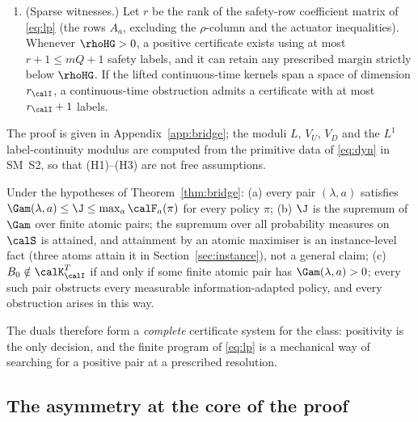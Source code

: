 \begin{theorem}
\begin{enumerate}[label=\textup{(\roman*)},leftmargin=2.4em,itemsep=2pt]
\begin{equation}
\J=\sup\bigl\{\Gam(\lambda,a):\ q\in\N,\ a_1,\dots,a_q\in\calS,\ \lambda\in\Delta_q\bigr\}.
\end{equation}
In particular, nonviability is equivalent to the existence of a positive finite atomic certificate.
\item \textup{(Sparse witnesses.)} Let $r$ be the rank of the safety-row coefficient matrix of \eqref{eq:lp} (the rows $A_a$, excluding the $\rho$-column and the actuator inequalities). Whenever $\rhoHG>0$, a positive certificate exists using at most $r+1\le mQ+1$ safety labels, and it can retain any prescribed margin strictly below $\rhoHG$. If the lifted continuous-time kernels span a space of dimension $r_\calI$, a continuous-time obstruction admits a certificate with at most $r_\calI+1$ labels.
\end{enumerate}
\end{theorem}

The proof is given in Appendix~\ref{app:bridge}; the moduli $L$, $V_U$, $V_D$ and the $L^1$ label-continuity modulus are computed from the primitive data of \eqref{eq:dyn} in SM~S2, so that (H1)--(H3) are not free assumptions.

\begin{corollary}\label{cor:dual}
Under the hypotheses of Theorem~\ref{thm:bridge}:
\textup{(a)} every pair $(\lambda,a)$ satisfies $\Gam(\lambda,a)\le\J\le\max_a\calF_a(\pi)$ for every policy $\pi$;
\textup{(b)} $\J$ is the supremum of $\Gam$ over finite atomic pairs; the supremum over all probability measures on $\calS$ is attained, and attainment by an atomic maximiser is an instance-level fact (three atoms attain it in Section~\ref{sec:instance}), not a general claim;
\textup{(c)} $B_0\notin\calK^T_\calI$ if and only if some finite atomic pair has $\Gam(\lambda,a)>0$; every such pair obstructs every measurable information-adapted policy, and every obstruction arises in this way.
\end{corollary}

The duals therefore form a \emph{complete} certificate system for the class: positivity is the only decision, and the finite program of \eqref{eq:lp} is a mechanical way of searching for a positive pair at a prescribed resolution.

\subsection{The asymmetry at the core of the proof}

